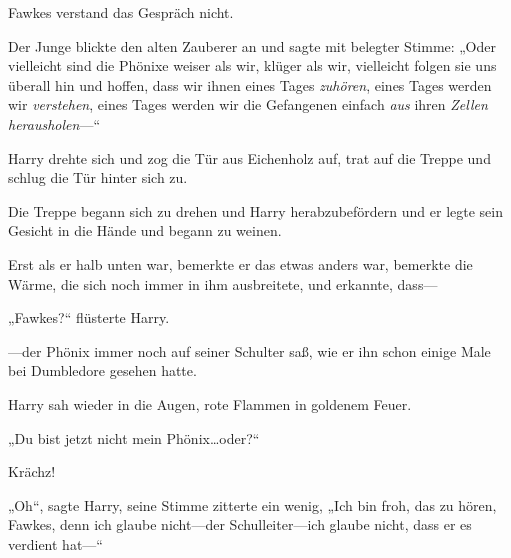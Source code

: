 Fawkes verstand das Gespräch nicht.

Der Junge blickte den alten Zauberer an und sagte mit belegter Stimme:
„Oder vielleicht sind die Phönixe weiser als wir, klüger als wir, vielleicht folgen sie uns überall hin und hoffen, dass wir ihnen eines Tages \emph{zuhören}, eines Tages werden wir \emph{verstehen}, eines Tages werden wir die Gefangenen einfach \emph{aus} ihren \emph{Zellen} \emph{herausholen}—“

Harry drehte sich und zog die Tür aus Eichenholz auf, trat auf die Treppe und schlug die Tür hinter sich zu.

Die Treppe begann sich zu drehen und Harry herabzubefördern und er legte sein Gesicht in die Hände und begann zu weinen.

Erst als er halb unten war, bemerkte er das etwas anders war, bemerkte die Wärme, die sich noch immer in ihm ausbreitete, und erkannte, dass—

„Fawkes?“ flüsterte Harry.

—der Phönix immer noch auf seiner Schulter saß, wie er ihn schon einige Male bei Dumbledore gesehen hatte.

Harry sah wieder in die Augen, rote Flammen in goldenem Feuer.

„Du bist jetzt nicht mein Phönix…oder?“

Krächz!

„Oh“, sagte Harry, seine Stimme zitterte ein wenig,
„Ich bin froh, das zu hören, Fawkes, denn ich glaube nicht—der Schulleiter—ich glaube nicht, dass er es verdient hat—“

